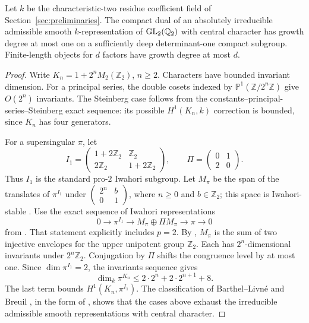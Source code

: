 \begin{lemma}\label{lem:simple-growth}
Let \(k\) be the characteristic-two residue coefficient field of
Section~\ref{sec:preliminaries}. The compact dual of an absolutely
irreducible admissible smooth \(k\)-representation of
\(\operatorname{GL}_2(\mathbb Q_2)\) with central
character has growth degree at most one on a sufficiently
deep determinant-one compact subgroup. Finite-length
objects for \(d\) factors have growth degree at most \(d\).
\end{lemma}
\begin{proof}
Write \(K_n=1+2^nM_2(\mathbb Z_2)\), \(n\ge2\).
Characters have bounded invariant dimension. For a
principal series, the double cosets indexed by
\(\mathbb P^1(\mathbb Z/2^n\mathbb Z)\) give
\(O(2^n)\) invariants. The Steinberg case follows from
the constants--principal-series--Steinberg exact
sequence: its possible \(H^1(K_n,k)\) correction is
bounded, since \(K_n\) has four generators.

For a supersingular \(\pi\), let
\[
 I_1=\begin{pmatrix}1+2\mathbb Z_2&\mathbb Z_2\\
                    2\mathbb Z_2&1+2\mathbb Z_2\end{pmatrix},
 \qquad \Pi=\begin{pmatrix}0&1\\2&0\end{pmatrix}.
\]
Thus \(I_1\) is the standard pro-\(2\) Iwahori subgroup.
Let \(M_\pi\) be the span of the translates of \(\pi^{I_1}\)
under \(\left(\begin{smallmatrix}2^n&b\\0&1\end{smallmatrix}\right)\),
where \(n\ge0\) and \(b\in\mathbb Z_2\);
this space is Iwahori-stable
\cite[Definition~4.5 and Lemma~4.6]{Paskunas2010}.
Use the exact sequence of Iwahori representations
\[
 0\longrightarrow \pi^{I_1}\longrightarrow
 M_\pi\oplus\Pi M_\pi\longrightarrow\pi\longrightarrow0
\]
from \cite[Theorem~1.2, proved as Theorem~6.3]{Paskunas2010}.
That statement explicitly includes \(p=2\).
By \cite[Proposition~4.7 and Lemma~4.10]{Paskunas2010},
\(M_\pi\) is the sum of two injective envelopes for the
upper unipotent group \(\mathbb Z_2\). Each has
\(2^n\)-dimensional invariants under \(2^n\mathbb Z_2\).
Conjugation by \(\Pi\) shifts the congruence level by
at most one. Since \(\dim\pi^{I_1}=2\), the invariants
sequence gives
\[
 \dim_k\pi^{K_n}\le 2\cdot2^n+2\cdot2^{n+1}+8.
\]
The last term bounds \(H^1(K_n,\pi^{I_1})\).
The classification of Barthel--Livn\'e and Breuil
\cite{BarthelLivne1994,BarthelLivne1995}, in the form of
\cite[Corollary~1.2]{Breuil2003I}, shows that the cases above exhaust
the irreducible admissible smooth representations with central character.


\end{proof}
